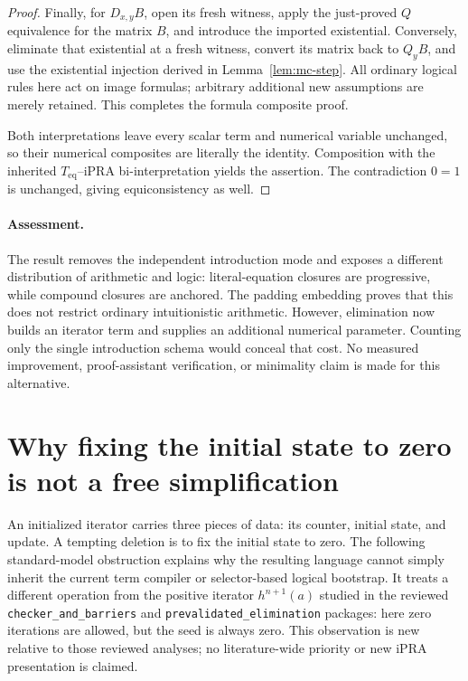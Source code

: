 \documentclass[11pt,letterpaper]{article}
\theoremstyle{definition}
\theoremstyle{remark}
\begin{document}
\begin{proof}
Finally, for $D_{x,y}B$, open its fresh witness, apply the just-proved
$Q$ equivalence for the matrix $B$, and introduce the imported
existential.  Conversely, eliminate that existential at a fresh
witness, convert its matrix back to $Q_yB$, and use the existential
injection derived in Lemma~\ref{lem:mc-step}.  All ordinary logical
rules here act on image formulas; arbitrary additional new assumptions
are merely retained.  This completes the formula composite proof.

Both interpretations leave every scalar term and numerical variable
unchanged, so their numerical composites are literally the identity.
Composition with the inherited $T_{\mathrm{eq}}$--iPRA
bi-interpretation yields the assertion.  The contradiction $0=1$
is unchanged, giving equiconsistency as well.
\end{proof}

\paragraph{Assessment.}
The result removes the independent introduction mode and exposes a
different distribution of arithmetic and logic: literal-equation
closures are progressive, while compound closures are anchored.
The padding embedding proves that this does not restrict ordinary
intuitionistic arithmetic.  However, elimination now builds an iterator
term and supplies an additional numerical parameter.  Counting only the
single introduction schema would conceal that cost.  No measured
improvement, proof-assistant verification, or minimality claim is made
for this alternative.


\section{Why fixing the initial state to zero is not a free simplification}
\label{sec:zero-start-obstruction}

An initialized iterator carries three pieces of data: its counter, initial
state, and update. A tempting deletion is to fix the initial state to zero.
The following standard-model obstruction explains why the resulting language
cannot simply inherit the current term compiler or selector-based logical
bootstrap. It treats a different operation from the positive iterator
$h^{n+1}(a)$ studied in the reviewed \texttt{checker\_and\_barriers} and
\texttt{prevalidated\_elimination} packages: here zero iterations are allowed,
but the seed is always zero. This observation is new relative to those
reviewed analyses; no literature-wide priority or new iPRA presentation is
claimed.
\end{document}
